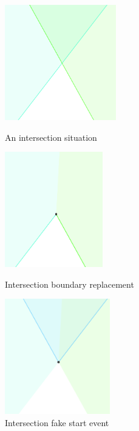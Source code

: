 \documentclass[12pt]{article}
\begin{document}
\begin{figure}[H]
  \centering
  \includegraphics[height=5cm]{Images/intersection_intersect.png}
  \caption{An intersection situation}
  \label{fig:intersectionIntersection}
\endminipage\hfill
{}
  \centering
  \includegraphics[height=5cm]{Images/intersection_intersectOldBoundaryCut.png}
  \caption{Intersection boundary replacement}
  \label{fig:intersectionIntersectionOldBoundary}
\endminipage\hfill
{}
  \centering
  \includegraphics[height=5cm]{Images/intersection_intersectNewStartEvent.png}
  \caption{Intersection fake start event}
  \label{fig:intersectionIntersectionNewStartEvent}
\endminipage
\end{figure}
\end{document}
